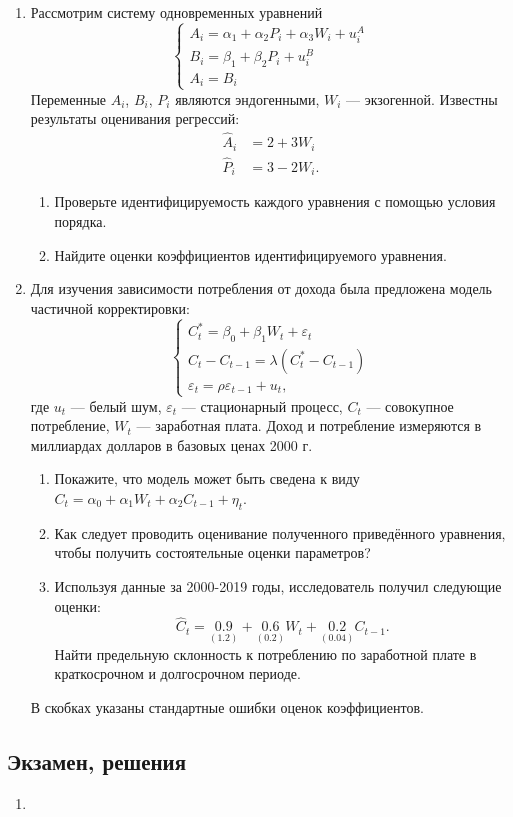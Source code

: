 \begin{enumerate}
  \item Рассмотрим систему одновременных уравнений
  \[
  \begin{cases}
  A_{i}=\alpha_{1}+\alpha_{2} P_{i}+\alpha_{3} W_{i}+u_{i}^{A} \\
  B_{i}=\beta_{1}+\beta_{2} P_{i}+u_{i}^{B} \\
  A_{i}=B_{i}
  \end{cases}
  \]
  Переменные $A_{i}$, $B_{i}$, $P_{i}$ являются эндогенными, $W_{i}$ — экзогенной. 
  Известны результаты оценивания регрессий:
  \[
  \begin{aligned}
  \hat{A}_{i} &=2+3 W_{i} \\
  \hat{P}_{i} &=3-2 W_{i}.
  \end{aligned}
  \]

  \begin{enumerate}
    \item Проверьте идентифицируемость каждого уравнения с помощью условия порядка.
    \item Найдите оценки коэффициентов идентифицируемого уравнения. 
  \end{enumerate}

  \item Для изучения зависимости потребления от дохода была предложена модель частичной корректировки:
  \[
  \begin{cases}
  C_{t}^{*}       = \beta_0 + \beta_1 W_t + \varepsilon_t \\
  C_{t} - C_{t-1} = \lambda (C_t^{*}-C_{t-1}) \\
  \varepsilon_t=\rho \varepsilon_{t-1} + u_t, 
  \end{cases}
  \]
  где $u_t$ — белый шум, $\varepsilon_t$ — стационарный процесс, $C_t$ — совокупное потребление, $W_t$ — заработная плата. 
  Доход и потребление измеряются в миллиардах долларов в базовых ценах 2000 г.

  \begin{enumerate}
    \item Покажите, что модель может быть сведена к виду $C_{t}=\alpha_{0}+\alpha_{1} W_{t}+\alpha_{2} C_{t-1}+\eta_{t}$.
    \item Как следует проводить оценивание полученного приведённого уравнения, чтобы получить состоятельные оценки параметров?
    \item Используя данные за 2000-2019 годы, исследователь получил следующие оценки:
    \[
    \hat{C}_{t}=\underset{(1.2)}{0.9}+\underset{(0.2)}{0.6} W_{t}+\underset{(0.04)}{0.2} C_{t-1}.
    \]
    Найти предельную склонность к потреблению по заработной плате в краткосрочном и долгосрочном периоде. 
  \end{enumerate}

  В скобках указаны стандартные ошибки оценок коэффициентов.

\end{enumerate}


\subsection{Экзамен, решения}

\begin{enumerate}
  \item 
\end{enumerate}